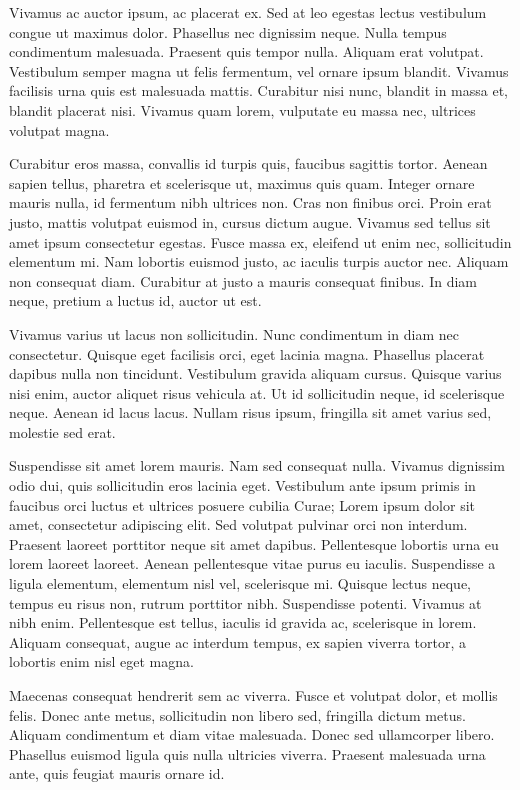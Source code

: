 Vivamus ac auctor ipsum, ac placerat ex. Sed at leo egestas lectus vestibulum congue ut maximus dolor. Phasellus nec dignissim neque. Nulla tempus condimentum malesuada. Praesent quis tempor nulla. Aliquam erat volutpat. Vestibulum semper magna ut felis fermentum, vel ornare ipsum blandit. Vivamus facilisis urna quis est malesuada mattis. Curabitur nisi nunc, blandit in massa et, blandit placerat nisi. Vivamus quam lorem, vulputate eu massa nec, ultrices volutpat magna.

Curabitur eros massa, convallis id turpis quis, faucibus sagittis tortor. Aenean sapien tellus, pharetra et scelerisque ut, maximus quis quam. Integer ornare mauris nulla, id fermentum nibh ultrices non. Cras non finibus orci. Proin erat justo, mattis volutpat euismod in, cursus dictum augue. Vivamus sed tellus sit amet ipsum consectetur egestas. Fusce massa ex, eleifend ut enim nec, sollicitudin elementum mi. Nam lobortis euismod justo, ac iaculis turpis auctor nec. Aliquam non consequat diam. Curabitur at justo a mauris consequat finibus. In diam neque, pretium a luctus id, auctor ut est.

Vivamus varius ut lacus non sollicitudin. Nunc condimentum in diam nec consectetur. Quisque eget facilisis orci, eget lacinia magna. Phasellus placerat dapibus nulla non tincidunt. Vestibulum gravida aliquam cursus. Quisque varius nisi enim, auctor aliquet risus vehicula at. Ut id sollicitudin neque, id scelerisque neque. Aenean id lacus lacus. Nullam risus ipsum, fringilla sit amet varius sed, molestie sed erat.

Suspendisse sit amet lorem mauris. Nam sed consequat nulla. Vivamus dignissim odio dui, quis sollicitudin eros lacinia eget. Vestibulum ante ipsum primis in faucibus orci luctus et ultrices posuere cubilia Curae; Lorem ipsum dolor sit amet, consectetur adipiscing elit. Sed volutpat pulvinar orci non interdum. Praesent laoreet porttitor neque sit amet dapibus. Pellentesque lobortis urna eu lorem laoreet laoreet. Aenean pellentesque vitae purus eu iaculis. Suspendisse a ligula elementum, elementum nisl vel, scelerisque mi. Quisque lectus neque, tempus eu risus non, rutrum porttitor nibh. Suspendisse potenti. Vivamus at nibh enim. Pellentesque est tellus, iaculis id gravida ac, scelerisque in lorem. Aliquam consequat, augue ac interdum tempus, ex sapien viverra tortor, a lobortis enim nisl eget magna.

Maecenas consequat hendrerit sem ac viverra. Fusce et volutpat dolor, et mollis felis. Donec ante metus, sollicitudin non libero sed, fringilla dictum metus. Aliquam condimentum et diam vitae malesuada. Donec sed ullamcorper libero. Phasellus euismod ligula quis nulla ultricies viverra. Praesent malesuada urna ante, quis feugiat mauris ornare id.

